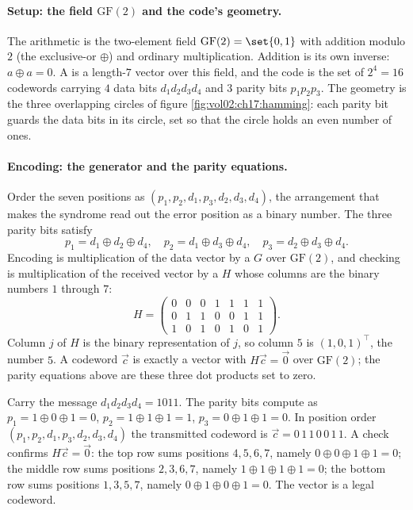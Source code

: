 \paragraph{Setup: the field $\mathrm{GF}(2)$ and the code's geometry.}
The arithmetic is the two-element field $\mathrm{GF}(2) =
\set{0, 1}$ with addition modulo $2$ (the exclusive-or $\oplus$) and
ordinary multiplication. Addition is its own inverse: $a \oplus a =
0$. A  is a length-$7$ vector over this field, and
the code is the set of $2^{4} = 16$ codewords carrying $4$ data bits
$d_{1} d_{2} d_{3} d_{4}$ and $3$ parity bits $p_{1} p_{2} p_{3}$.
The geometry is the three overlapping circles of figure
\ref{fig:vol02:ch17:hamming}: each parity bit guards the data bits
in its circle, set so that the circle holds an even number of ones.



\paragraph{Encoding: the generator and the parity equations.}
Order the seven positions as $(p_{1}, p_{2}, d_{1}, p_{3}, d_{2},
d_{3}, d_{4})$, the arrangement that makes the syndrome read out the
error position as a binary number. The three parity bits satisfy
\[
p_{1} = d_{1} \oplus d_{2} \oplus d_{4}, \quad
p_{2} = d_{1} \oplus d_{3} \oplus d_{4}, \quad
p_{3} = d_{2} \oplus d_{3} \oplus d_{4}.
\]
Encoding is multiplication of the data vector by a
 $G$ over $\mathrm{GF}(2)$, and checking
is multiplication of the received vector by a  $H$ whose columns are the binary numbers $1$ through $7$:
\[
H = \begin{pmatrix}
0 & 0 & 0 & 1 & 1 & 1 & 1 \\
0 & 1 & 1 & 0 & 0 & 1 & 1 \\
1 & 0 & 1 & 0 & 1 & 0 & 1
\end{pmatrix}.
\]
Column $j$ of $H$ is the binary representation of $j$, so column $5$
is $(1, 0, 1)^{\!\top}$, the number $5$. A codeword $\vec{c}$ is
exactly a vector with $H \vec{c} = \vec{0}$ over $\mathrm{GF}(2)$;
the parity equations above are these three dot products set to zero.

Carry the message $d_{1} d_{2} d_{3} d_{4} = 1011$. The parity bits
compute as $p_{1} = 1 \oplus 0 \oplus 1 = 0$, $p_{2} = 1 \oplus 1
\oplus 1 = 1$, $p_{3} = 0 \oplus 1 \oplus 1 = 0$. In position order
$(p_{1}, p_{2}, d_{1}, p_{3}, d_{2}, d_{3}, d_{4})$ the transmitted
codeword is $\vec{c} = 0\,1\,1\,0\,0\,1\,1$. A check confirms
$H \vec{c} = \vec{0}$: the top row sums positions $4,5,6,7$, namely
$0 \oplus 0 \oplus 1 \oplus 1 = 0$; the middle row sums positions
$2,3,6,7$, namely $1 \oplus 1 \oplus 1 \oplus 1 = 0$; the bottom row
sums positions $1,3,5,7$, namely $0 \oplus 1 \oplus 0 \oplus 1 = 0$.
The vector is a legal codeword.

